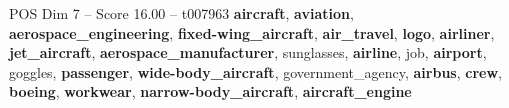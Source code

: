 \begin{textsample}{POS Dim 7 – Score 16.00 – t007963}  \label{ex:f7_pos_027}
\textbf{aircraft}, \textbf{aviation}, \textbf{aerospace\_engineering}, \textbf{fixed-wing\_aircraft}, \textbf{air\_travel}, \textbf{logo}, \textbf{airliner}, \textbf{jet\_aircraft}, \textbf{aerospace\_manufacturer}, sunglasses, \textbf{airline}, job, \textbf{airport}, goggles, \textbf{passenger}, \textbf{wide-body\_aircraft}, government\_agency, \textbf{airbus}, \textbf{crew}, \textbf{boeing}, \textbf{workwear}, \textbf{narrow-body\_aircraft}, \textbf{aircraft\_engine}

\end{textsample}
